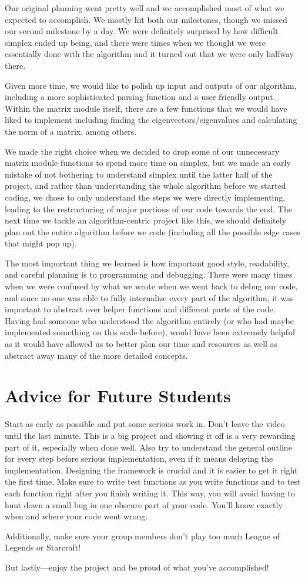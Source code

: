 \documentclass[letterpaper,11pt]{article}
\begin{document}
Our original planning went pretty well and we accomplished most of what we
expected to accomplish. We mostly hit both our milestones, though we missed our
second milestone by a day. We were definitely surprised by how difficult simplex
ended up being, and there were times when we thought we were essentially done
with the algorithm and it turned out that we were only halfway there. 

Given more time, we would like to polish up input and outputs of our algorithm,
including a more sophisticated parsing function and a user friendly output.
Within the matrix module itself, there are a few functions that we would have
liked to implement including finding the eigenvectors/eigenvalues and
calculating the norm of a matrix, among others. 

We made the right choice when we decided to drop some of our unnecessary matrix
module functions to spend more time on simplex, but we made an early mistake of
not bothering to understand simplex until the latter half of the project, and
rather than understanding the whole algorithm before we started coding, we chose
to only understand the steps we were directly implementing, leading to the
restructuring of major portions of our code towards the end. The next time we
tackle an algorithm-centric project like this, we should definitely plan out the
entire algorithm before we code (including all the possible edge cases that
might pop up).

The most important thing we learned is how important good style, readability,
and careful planning is to programming and debugging. There were many times when
we were confused by what we wrote when we went back to debug our code, and since
no one was able to fully internalize every part of the algorithm, it was
important to abstract over helper functions and different parts of the code.
Having had someone who understood the algorithm entirely (or who had maybe
implemented something on this scale before), would have been extremely helpful
as it would have allowed us to better plan our time and resources as well as
abstract away many of the more detailed concepts.

\section{Advice for Future Students}

Start as early as possible and put some serious work in. Don't leave the video
until the last minute. This is a big project and showing it off is a very
rewarding part of it, especially when done well. Also try to understand the
general outline for every step before serious implementation, even if it means
delaying the implementation. Designing the framework is crucial and it is easier
to get it right the first time. Make sure to write test functions as you write
functions and to test each function right after you finish writing it. This way,
you will avoid having to hunt down a small bug in one obscure part of your code.
You'll know exactly when and where your code went wrong. 

Additionally, make sure your group members don't play too much League of Legends
or Starcraft!

But lastly---enjoy the project and be proud of what you've accomplished!
\end{document}
